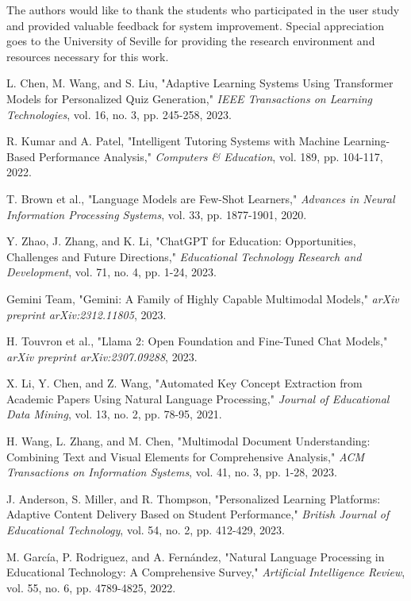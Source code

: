 \documentclass[conference]{IEEEtran}
\begin{document}
The authors would like to thank the students who participated in the user study and provided valuable feedback for system improvement. Special appreciation goes to the University of Seville for providing the research environment and resources necessary for this work.

\begin{thebibliography}{00}
 L. Chen, M. Wang, and S. Liu, "Adaptive Learning Systems Using Transformer Models for Personalized Quiz Generation," \textit{IEEE Transactions on Learning Technologies}, vol. 16, no. 3, pp. 245-258, 2023.

 R. Kumar and A. Patel, "Intelligent Tutoring Systems with Machine Learning-Based Performance Analysis," \textit{Computers \& Education}, vol. 189, pp. 104-117, 2022.

 T. Brown et al., "Language Models are Few-Shot Learners," \textit{Advances in Neural Information Processing Systems}, vol. 33, pp. 1877-1901, 2020.

 Y. Zhao, J. Zhang, and K. Li, "ChatGPT for Education: Opportunities, Challenges and Future Directions," \textit{Educational Technology Research and Development}, vol. 71, no. 4, pp. 1-24, 2023.

 Gemini Team, "Gemini: A Family of Highly Capable Multimodal Models," \textit{arXiv preprint arXiv:2312.11805}, 2023.

 H. Touvron et al., "Llama 2: Open Foundation and Fine-Tuned Chat Models," \textit{arXiv preprint arXiv:2307.09288}, 2023.

 X. Li, Y. Chen, and Z. Wang, "Automated Key Concept Extraction from Academic Papers Using Natural Language Processing," \textit{Journal of Educational Data Mining}, vol. 13, no. 2, pp. 78-95, 2021.

 H. Wang, L. Zhang, and M. Chen, "Multimodal Document Understanding: Combining Text and Visual Elements for Comprehensive Analysis," \textit{ACM Transactions on Information Systems}, vol. 41, no. 3, pp. 1-28, 2023.

 J. Anderson, S. Miller, and R. Thompson, "Personalized Learning Platforms: Adaptive Content Delivery Based on Student Performance," \textit{British Journal of Educational Technology}, vol. 54, no. 2, pp. 412-429, 2023.

 M. García, P. Rodriguez, and A. Fernández, "Natural Language Processing in Educational Technology: A Comprehensive Survey," \textit{Artificial Intelligence Review}, vol. 55, no. 6, pp. 4789-4825, 2022.


\end{thebibliography}
\end{document}
